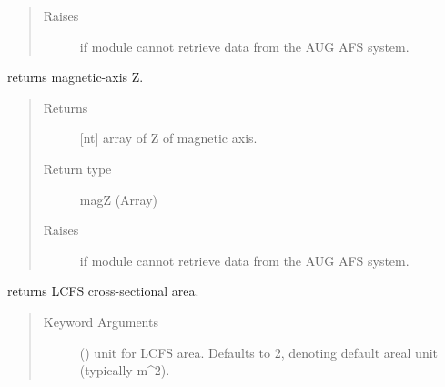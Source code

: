 \documentclass[letterpaper,10pt,english]{sphinxmanual}
\begin{document}
\begin{fulllineitems}
\begin{fulllineitems}
\begin{quote}
\begin{description}
\item[{Raises}] \leavevmode
{} \textendash{} if module cannot retrieve data from the AUG AFS system.

\end{description}\end{quote}

\end{fulllineitems}


\begin{fulllineitems}
\label{\detokenize{eqtools:eqtools.AUGData.AUGDDData.getMagZ}}
returns magnetic-axis Z.
\begin{quote}\begin{description}
\item[{Returns}] \leavevmode
{[}nt{]} array of Z of magnetic axis.

\item[{Return type}] \leavevmode
magZ (Array)

\item[{Raises}] \leavevmode
{} \textendash{} if module cannot retrieve data from the AUG AFS system.

\end{description}\end{quote}

\end{fulllineitems}


\begin{fulllineitems}
\label{\detokenize{eqtools:eqtools.AUGData.AUGDDData.getAreaLCFS}}
returns LCFS cross-sectional area.
\begin{quote}\begin{description}
\item[{Keyword Arguments}] \leavevmode
{} () \textendash{} unit for LCFS area.  Defaults to 2,
denoting default areal unit (typically m\textasciicircum{}2).


\end{description}
\end{quote}
\end{fulllineitems}
\end{fulllineitems}
\end{document}
